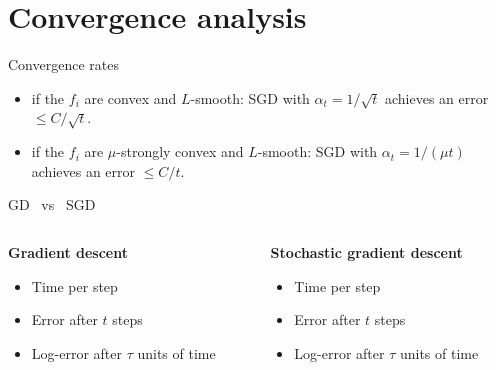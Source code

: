 \documentclass{beamer}
\begin{document}
\section{Convergence analysis}

\begin{frame}[t]{Convergence rates}
	\grid

	\begin{exampleblock}{}
		\begin{itemize}
			\item if the $f_i$ are convex and $L$-smooth: SGD with $\alpha_t = 1 / \sqrt{t}$ achieves an error $\leq C / \sqrt{t}$.
			\item if the $f_i$ are $\mu$-strongly convex and $L$-smooth: SGD with $\alpha_t = 1 / (\mu t)$ achieves an error $\leq C / t$.
		\end{itemize}
	\end{exampleblock}

\end{frame}


\begin{frame}[t]{GD \ vs \ SGD}
	\grid

	\begin{columns}
		\begin{column}{0.45\textwidth}
			\vspace{-0.5cm}
			\begin{center}
				\textbf{Gradient descent}
			\end{center}
			\begin{itemize}
				\item Time per step
			\vspace{1cm}
				\item Error after $t$ steps
			\vspace{2cm}
				\item Log-error after $\tau$ units of time
			\vspace{2cm}
			\end{itemize}
	\end{column}
	\vrule
		\begin{column}{0.55\textwidth}
			\vspace{-0.5cm}
			\begin{center}
				\textbf{Stochastic gradient descent}
			\end{center}
			\begin{itemize}
				\item Time per step
			\vspace{1cm}
				\item Error after $t$ steps
			\vspace{2cm}
				\item Log-error after $\tau$ units of time
			\vspace{2cm}
			\end{itemize}
	\end{column}
	\end{columns}

\end{frame}
\end{document}
